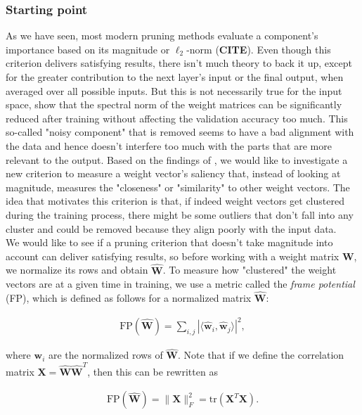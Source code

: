 \subsubsection*{Starting point}
As we have seen, most modern pruning methods evaluate a component's importance based on its magnitude or $\ell_2$-norm (\textbf{CITE}). Even though this criterion delivers satisfying results, there isn't much theory to back it up, except for the greater contribution to the next layer's input or the final output, when averaged over all possible inputs. But this is not necessarily true for the input space, \cite{nagarajan2019uniform} show that the spectral norm of the weight matrices can be significantly reduced after training without affecting the validation accuracy too much. This so-called "noisy component" that is removed seems to have a bad alignment with the data and hence doesn't interfere too much with the parts that are more relevant to the output. Based on the findings of \cite{brutzkus2019larger}, we would like to investigate a new criterion to measure a weight vector's saliency that, instead of looking at magnitude, measures the "closeness" or "similarity" to other weight vectors. The idea that motivates this criterion is that, if indeed weight vectors get clustered during the training process, there might be some outliers that don't fall into any cluster and could be removed because they align poorly with the input data. \\

We would like to see if a pruning criterion that doesn't take magnitude into account can deliver satisfying results, so before working with a weight matrix $\mathbf{W}$, we normalize its rows and obtain $\hat{\mathbf{W}}$. To measure how "clustered" the weight vectors are at a given time in training, we use a metric called the \textit{frame potential} (FP), which is defined as follows for a normalized matrix $\hat{\mathbf{W}}$:

\begin{align*}
\text{FP}(\hat{\mathbf{W}}) = \sum\limits_{i,j} |\langle \hat{\mathbf{w}}_i, \hat{\mathbf{w}}_j \rangle|^2,
\end{align*}

where $\mathbf{w}_i$ are the normalized rows of $\hat{\mathbf{W}}$. Note that if we define the correlation matrix $\mathbf{X} =  \hat{\mathbf{W}}\hat{\mathbf{W}}^T$, then this can be rewritten as

\begin{align*}
\text{FP}(\hat{\mathbf{W}}) = \|\mathbf{X}\|_F^2 = \text{tr}(\mathbf{X}^T\mathbf{X}).
\end{align*}

